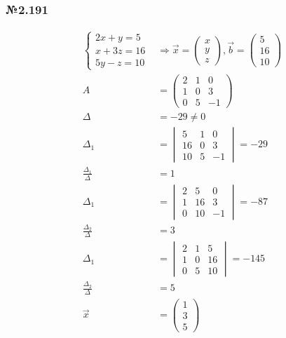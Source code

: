 \documentclass{article}
\begin{document}
\subsubsection*{№2.191}

\begin{align*}
	\begin{cases}
		2x + y = 5 \\
		x + 3z = 16 \\
		5y - z = 10
	\end{cases}
	&\Rightarrow
	\vec{x} = \begin{pmatrix}x \\ y \\ z\end{pmatrix},
	\vec{b} = \begin{pmatrix}5 \\ 16 \\ 10\end{pmatrix} \\
	A &= \begin{pmatrix}
		2 & 1 & 0 \\
		1 & 0 & 3 \\
		0 & 5 & -1
	\end{pmatrix} \\
	\Delta &= -29 \ne 0 \\
	\Delta_1 &= \begin{vmatrix}
		5 & 1 & 0 \\
		16 & 0 & 3 \\
		10 & 5 & -1
	\end{vmatrix} = -29 \\
	\frac{\Delta_1}{\Delta} &= 1 \\
	\Delta_1 &= \begin{vmatrix}
		2 & 5 & 0 \\
		1 & 16 & 3 \\
		0 & 10 & -1
	\end{vmatrix} = -87 \\
	\frac{\Delta_2}{\Delta} &= 3 \\
	\Delta_1 &= \begin{vmatrix}
		2 & 1 & 5 \\
		1 & 0 & 16 \\
		0 & 5 & 10
	\end{vmatrix} = -145 \\
	\frac{\Delta_2}{\Delta} &= 5 \\
	\vec{x} &= \begin{pmatrix}1 \\ 3 \\ 5\end{pmatrix}
\end{align*}
\end{document}
